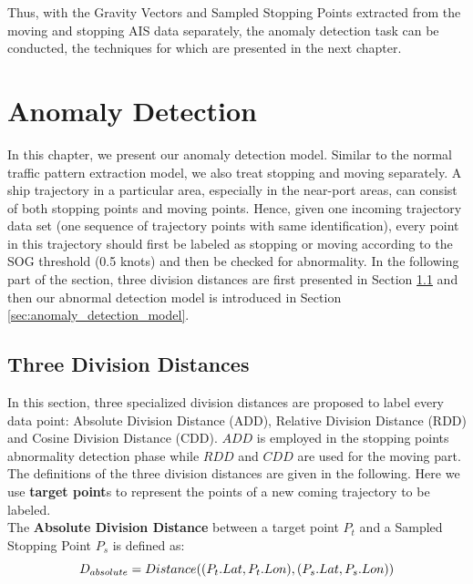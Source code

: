 \documentclass[12pt,glossary]{dalcsthesis}
\begin{document}
Thus, with the Gravity Vectors and Sampled Stopping Points extracted from the moving and stopping AIS data separately, the anomaly detection task can be conducted, the techniques for which are presented in the next chapter.



\chapter{Anomaly Detection}
\label{ch:anomaly_detection}

In this chapter, we present our anomaly detection model. Similar to the normal traffic pattern extraction model, we also treat stopping and moving separately. A ship trajectory in a particular area, especially in the near-port areas, can consist of both stopping points and moving points. Hence, given one incoming trajectory data set (one sequence of trajectory points with same identification), every point in this trajectory should first be labeled as stopping or moving according to the SOG threshold (0.5 knots) and then be checked for abnormality.  In the following part of the section, three division distances are first presented in Section \ref{sec:three_division_distances} and then our abnormal detection model is introduced in Section \ref{sec:anomaly_detection_model}.

\section{Three Division Distances}
\label{sec:three_division_distances}

In this section,  three specialized division distances are proposed to label every data point: Absolute Division Distance (ADD), Relative Division Distance (RDD) and Cosine Division Distance (CDD). $ADD$ is employed in the stopping points abnormality detection phase while $RDD$ and $CDD$ are used for the moving part. The definitions of the three division distances are given in the following. Here we use \textbf{target point}s to represent the points of a new coming trajectory to be labeled.\\

The \textbf{Absolute Division Distance} between a target point $P_t$ and a Sampled Stopping Point $P_s$ is defined as:
\begin{equation}
\label{eq:add}
D_{absolute} = \\
Distance((P_t.Lat,P_t.Lon),(P_s.Lat,P_s.Lon))
\end{equation}
\end{document}
